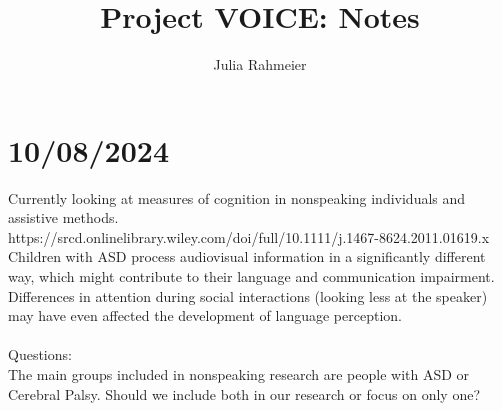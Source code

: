 \documentclass{article}
\author{Julia Rahmeier}
\title{Project VOICE: Notes}
\begin{document}
	
	\maketitle
	
	\section{10/08/2024}
	Currently looking at measures of cognition in nonspeaking individuals and assistive methods. \\
	
	https://srcd.onlinelibrary.wiley.com/doi/full/10.1111/j.1467-8624.2011.01619.x \\
	
	Children with ASD process audiovisual information in a significantly different way, which might contribute to their language and communication impairment.
	Differences in attention during social interactions (looking less at the speaker) may have even affected the development of language perception. \\\\
	Questions: \\
	The main groups included in nonspeaking research are people with ASD or Cerebral Palsy. Should we include both in our research or focus on only one?
	
\end{document}
